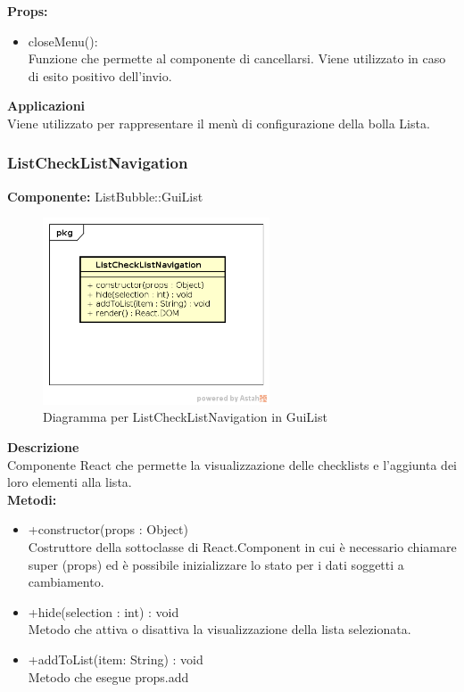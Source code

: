 \textbf{Props:} 
\begin{itemize}
\item closeMenu(): 
\\
Funzione che permette al componente di cancellarsi. Viene utilizzato in caso di esito positivo dell'invio.

\end{itemize} 


\textbf{Applicazioni}\\
Viene utilizzato per rappresentare il menù di configurazione della bolla Lista. 


\clearpage

\subsubsection{ListCheckListNavigation}
\textbf{Componente:}  ListBubble::GuiList\\
   \FloatBarrier
   \begin{figure}[ht]
   \centering
   \includegraphics[width=0.6\textwidth]{img/single-ListCheckListNavigation.png}
   \caption{{Diagramma per ListCheckListNavigation in GuiList}}
\end{figure}
\FloatBarrier
\textbf{Descrizione}\\
Componente React che permette la visualizzazione delle checklists e l'aggiunta dei loro elementi alla lista.  \\
\textbf{Metodi:} 
\begin{itemize}

\item +constructor(props : Object)
\\
Costruttore della sottoclasse di React.Component in cui è necessario chiamare super (props) ed è possibile inizializzare lo stato per i dati soggetti a cambiamento.

\item +hide(selection : int) : void  
\\
Metodo che attiva o disattiva la visualizzazione della lista selezionata.

\item +addToList(item: String) : void
\\
Metodo che esegue props.add

\end{itemize}

